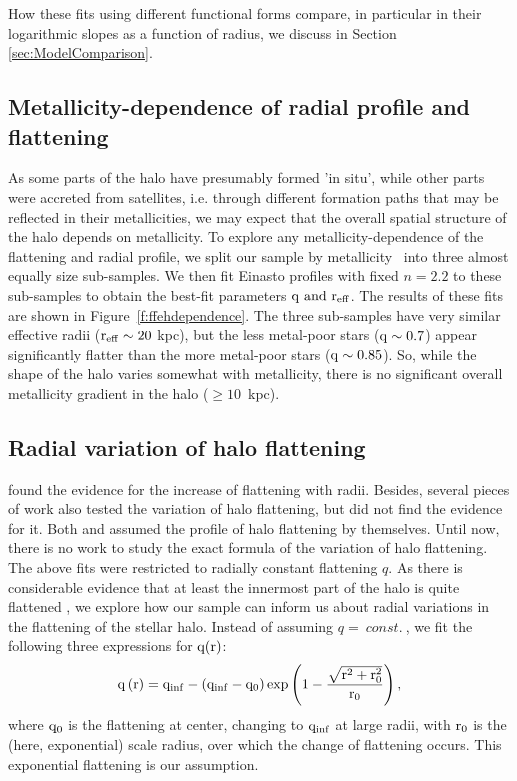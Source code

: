 \documentclass[12pt,preprint]{aastex}
\begin{document}
How these fits using different functional forms compare, in particular in their logarithmic slopes as a function of radius, we discuss in Section \ref{sec:ModelComparison}.

\subsection{Metallicity-dependence of radial profile and flattening}\label{sec:Results_Flattening}

As some parts of the halo have presumably formed 'in situ', while other parts were accreted from satellites, i.e. through different formation paths that may be reflected in their metallicities, 
 we may expect that the overall spatial structure of the halo depends on metallicity.
To explore any metallicity-dependence of the flattening and radial profile, we split our sample
by metallicity \ into three almost equally size sub-samples. We then fit Einasto profiles with fixed $n=2.2$ to these sub-samples to obtain the best-fit parameters $\rm q ~and ~r_{eff}$. The results of these fits are shown in Figure~\ref{f:ffehdependence}. The three sub-samples have very similar effective radii ($\rm r_{eff}\sim20~$kpc), but the less metal-poor stars ($\rm q\sim0.7$) appear
significantly flatter than the more metal-poor stars ($\rm q\sim0.85$).
So, while the shape of the halo varies somewhat with metallicity, there is no significant overall metallicity gradient in the halo ($\ge 10$~kpc). 

\subsection{Radial variation of halo flattening}\label{sec:Results_FlatteningVariations}
\citet{Preston1991} found the evidence for the increase of flattening with radii. Besides, several pieces of work also tested the variation of halo flattening, but did not find the evidence for it\citep{Sluis1998,Sesar2011,Deason2011}. Both \citet{Preston1991} and \citet{Sluis1998} assumed the profile of halo flattening by themselves. Until now, there is no work to study the exact formula of the variation of halo flattening. The above fits were restricted to radially constant flattening $q$. As there is considerable evidence that at least the innermost part of the halo is quite flattened \citep{Carollo2010}, we explore how our sample can inform us about radial variations in the flattening of the stellar halo.  Instead of assuming $q=~const.~$, we fit the following three expressions for $\rm q(r)$:
\begin{equation}
\rm q\left(r\right)=q_{inf}-\left(q_{inf}-q_0\right)exp\left(1-\frac{\sqrt{r^2+r_0^2}}{r_0}\right),
\end{equation}
where  $\rm q_0$ is the flattening at center, changing to $\rm q_{inf}$ at large radii, with $\rm r_0$ is the (here, exponential) scale radius, over which the change of flattening occurs. This exponential flattening is our assumption. 
\end{document}
